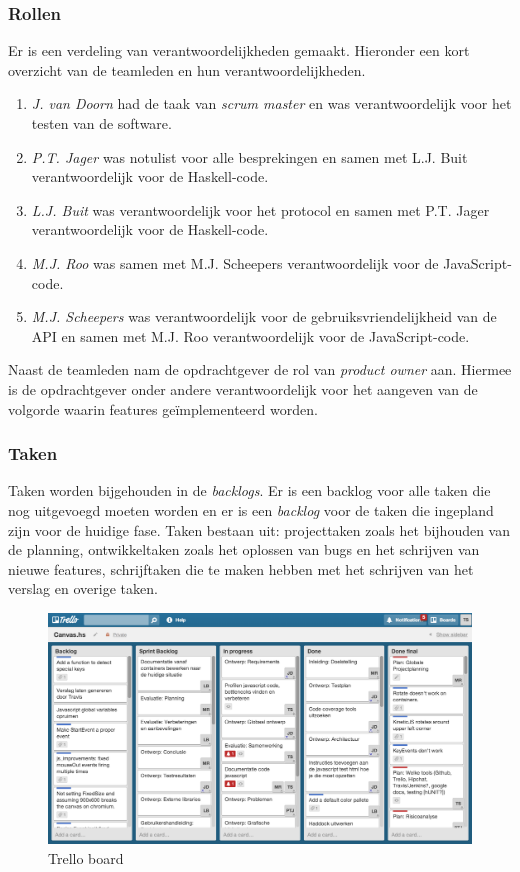 \subsubsection{Rollen}
Er is een verdeling van verantwoordelijkheden gemaakt. Hieronder een kort overzicht van de teamleden en hun verantwoordelijkheden.
\begin{enumerate}
    \item \emph{J. van Doorn} had de taak van \emph{scrum master} en was verantwoordelijk voor het testen van de software.
    \item \emph{P.T. Jager} was notulist voor alle besprekingen en samen met L.J. Buit verantwoordelijk voor de Haskell-code.
    \item \emph{L.J. Buit} was verantwoordelijk voor het protocol en samen met P.T. Jager verantwoordelijk voor de Haskell-code.
    \item \emph{M.J. Roo} was samen met M.J. Scheepers verantwoordelijk voor de JavaScript-code.
    \item \emph{M.J. Scheepers} was verantwoordelijk voor de gebruiksvriendelijkheid van de API en samen met M.J. Roo verantwoordelijk voor de JavaScript-code.
\end{enumerate}
Naast de teamleden nam de opdrachtgever de rol van \emph{product owner} aan. Hiermee is de opdrachtgever onder andere verantwoordelijk voor het aangeven van de volgorde waarin features ge\"implementeerd worden.

\subsubsection{Taken}
Taken worden bijgehouden in de \emph{backlogs}. Er is een backlog voor alle taken die nog uitgevoegd moeten worden en er is een \emph{backlog} voor de taken die ingepland zijn voor de huidige fase. Taken bestaan uit: projecttaken zoals het bijhouden van de planning, ontwikkeltaken zoals het oplossen van bugs en het schrijven van nieuwe features, schrijftaken die te maken hebben met het schrijven van het verslag en overige taken.

\begin{figure}[H]
\begin{center}
\includegraphics[keepaspectratio,width=\textwidth]{./images/trello.png}
\caption{Trello board}
\label{fig:trello}
\end{center}
\end{figure}

